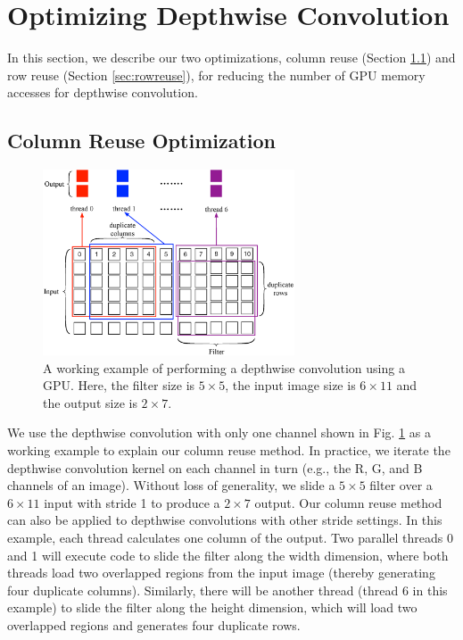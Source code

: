 \section{Optimizing Depthwise Convolution}
\label{sec:strategies} In this section, we describe our two optimizations, column reuse (Section \ref{sec:creuse}) and row reuse (Section
\ref{sec:rowreuse}), for reducing the number of GPU memory accesses for depthwise convolution.
\subsection{Column Reuse Optimization}
\label{sec:creuse}


\begin{figure}[t!]
\centering
  \includegraphics[width=0.9\columnwidth,height=5.5cm]{./figure/twostrategies.eps}
  \vspace{-3mm}
  \caption{A working example of performing a depthwise convolution using a GPU. Here, the filter size is $5 \times 5$, the input image size is $6 \times 11$
  and the output size is $2 \times 7$.}
  \label{fig:twostrategies}
\end{figure}


 We use the depthwise convolution with only one channel shown in Fig. \ref{fig:twostrategies} as a working
example to explain our column reuse method. In practice, we iterate the depthwise convolution kernel on each channel in turn (e.g., the R,
G, and B channels of an image). Without loss of generality, we slide a $5 \times 5$ filter over a $6 \times 11$ input with stride 1 to
produce a $2 \times 7$ output. Our column reuse method can also be applied to depthwise convolutions with other stride settings. In this
example, each thread calculates one column of the output. Two parallel threads 0 and 1 will execute code to slide the filter along the
width dimension, where both threads load two overlapped regions from the input image (thereby generating four duplicate columns).
Similarly, there will be another thread (thread 6 in this example) to slide the filter along the height dimension, which will load two
overlapped regions and generates four duplicate rows.


